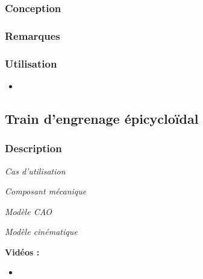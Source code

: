 \documentclass[11pt,oneside]{article}
\begin{document}
\subsubsection{Conception}
\subsubsection{Remarques}
\subsubsection{Utilisation}
\begin{itemize}
\item
\end{itemize}
\newpage

\subsection{Train d'engrenage épicycloïdal}
\subsubsection{Description}

\begin{center}
\hfill
\begin{minipage}[c]{.21\linewidth}
\begin{center}
\textit{Cas d'utilisation}
\end{center}
\end{minipage} \hfill
\begin{minipage}[c]{.21\linewidth}
\begin{center}
\textit{Composant mécanique}
\end{center}
\end{minipage} \hfill
\begin{minipage}[c]{.21\linewidth}
\begin{center}
\textit{Modèle CAO}
\end{center} 
\end{minipage}\hfill
\begin{minipage}[c]{.21\linewidth}
\begin{center}
\textit{Modèle cinématique}
\end{center} 
\end{minipage}\hfill
\end{center}


\textbf{Vidéos :}
\begin{itemize}
\item
\end{itemize}
\end{document}
